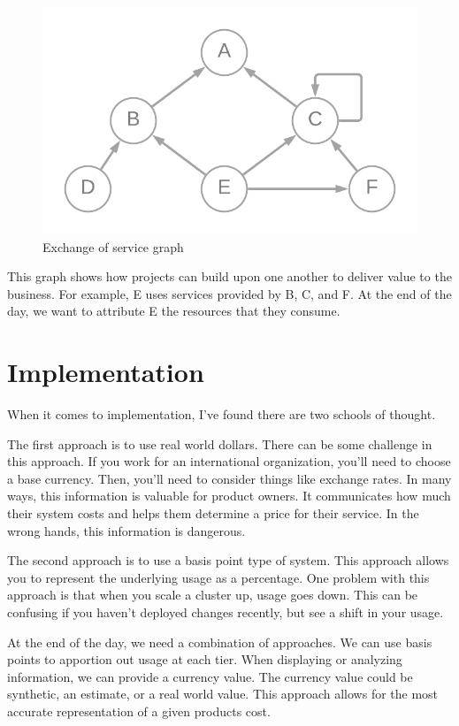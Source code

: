 \documentclass[10pt, a4paper, twocolumn]{article}
\begin{document}
    \begin{figure}[H]
      \centering
      \includegraphics[width=\linewidth]{./cost-attribution-graph.png}
      \caption{Exchange of service graph}
      \label{figure:2}
    \end{figure}

    This graph shows how projects can build upon one another to deliver value to the business.
    For example, E uses services provided by B, C, and F.
    At the end of the day, we want to attribute E the resources that they consume.

\section*{Implementation}
  When it comes to implementation, I've found there are two schools of thought.

  The first approach is to use real world dollars.
  There can be some challenge in this approach.
  If you work for an international organization, you'll need to choose a base currency.
  Then, you'll need to consider things like exchange rates.
  In many ways, this information is valuable for product owners.
  It communicates how much their system costs and helps them determine a price for their service.
  In the wrong hands, this information is dangerous.

  The second approach is to use a basis point type of system.
  This approach allows you to represent the underlying usage as a percentage.
  One problem with this approach is that when you scale a cluster up, usage goes down.
  This can be confusing if you haven't deployed changes recently, but see a shift in your usage.

  At the end of the day, we need a combination of approaches.
  We can use basis points to apportion out usage at each tier.
  When displaying or analyzing information, we can provide a currency value.
  The currency value could be synthetic, an estimate, or a real world value.
  This approach allows for the most accurate representation of a given products cost.
\end{document}
